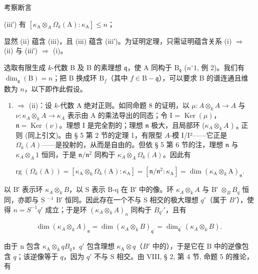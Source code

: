 考察断言

(iii′) 有 \([\kappa_{\mathrm{A}} \otimes_{A} \Omega_k(\mathrm{A}):\kappa_{\mathrm{A}}] \leqslant n\)；

显然 (ii) 蕴含 (iii)，且 (iii) 蕴含 (iii′)。为证明定理，只需证明蕴含关系 (i) \(\Rightarrow\) (ii) 与 (iii′) \(\Rightarrow\) (i)。

选取有限生成 \(k\)-代数 B 及 B 的素理想 \(\mathfrak{q}\)，使 A 同构于 \(\mathrm{B}_{\mathfrak{q}}\) (\(n^{\circ} 1\), 例 2)。我们有 \(\dim_{\mathfrak{q}}(\mathrm{B}) = n\)；把 B 换成环 \(\mathrm{B}_f\)（其中 \(f \in \mathrm{B} - \mathfrak{q}\)），可以要求 B 的谱连通且维数为 \(n\)，以下即作此假设。

\begin{enumerate}
\def\labelenumi{(\roman{enumi})}
\tightlist
\item
  \(\Rightarrow\) (ii)：设 \(k\)-代数 A 绝对正则。如同命题 8 的证明，以 \(\mu : A \otimes_k A \to A\) 与 \(\nu : \kappa_A \otimes_k A \to \kappa_A\) 表示由 A 的乘法导出的同态；令 I = \(\operatorname{Ker}(\mu)\)，\(\mathfrak{n} = \operatorname{Ker}(\nu)\)。理想 I 是完全割的；理想 \(\mathfrak{n}\) 极大，且局部环 (\(\kappa_A \otimes_k A\) ) \(_{\mathfrak{n}}\) 正则 (同上引文)。由 § 5 第 2 节的定理 1，有限型 \(A\)-模 I/I²——它正是 \(\Omega_k(A)\)——是投射的，从而是自由的。但依 § 5 第 6 节的注，理想 \(\mathfrak{n}\) 与 \(\kappa_A \otimes_A 1\) 恒同，于是 \(\mathfrak{n}/\mathfrak{n}^2\) 同构于 \(\kappa_A \otimes_A \Omega_k(A)\)。因此有
\end{enumerate}

\[
\operatorname{rg} \left(\Omega_ {k} (\mathrm{A})\right) = \left[ \kappa_ {\mathrm{A}} \otimes_ {k} \Omega_ {k} (\mathrm{A}): \kappa_ {\mathrm{A}} \right] = \left[ \mathfrak {n} / \mathfrak {n} ^ {2}: \kappa_ {\mathrm{A}} \right] = \dim \left(\kappa_ {\mathrm{A}} \otimes_ {k} \mathrm{A}\right) _ {\mathfrak {n}}.
\]

以 B′ 表示环 \(\kappa_{A}\otimes_{k}B\)，以 S 表示 B-q 在 B′ 中的像。环 \(\kappa_{A}\otimes_{k}A\) 与 B′ \(\otimes_{B}B_{q}\) 恒同，亦即与 S \(^{-1}\) B′ 恒同。因此存在一个不与 S 相交的极大理想 \(q'\)（属于 \(B'\)），使得 \(n = S^{-1}q'\) 成立；于是环 \((\kappa_A \otimes_k A)_n\) 同构于 \(B_{q'}'\)，且有

\[
\dim (\kappa_ {A} \otimes_ {k} A) _ {\mathfrak {n}} = \dim (\kappa_ {A} \otimes_ {k} B) _ {\mathfrak {q} ^ {\prime}} = \dim_ {\mathfrak {q} ^ {\prime}} (\kappa_ {A} \otimes_ {k} B).
\]

由于 n 包含 \(\kappa_{\mathrm{A}} \otimes_{k} qB_{q}\)，\(q'\) 包含理想 \(\kappa_{\mathrm{A}} \otimes q\)（\(B'\) 中的），于是它在 B 中的逆像包含 \(q\)；该逆像等于 \(q\)，因为 \(q'\) 不与 S 相交。由 VIII, § 2, 第 4 节, 命题 5 的推论，有

